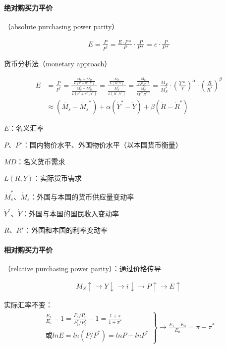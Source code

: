 \documentclass[12pt]{book}
\begin{document}
\paragraph{绝对购买力平价}

（absolute purchasing power parity）

\begin{gather*}
    E=\frac{P}{P^\ast}
    =\frac{E·P*}{P}·\frac{P}{P*}=e⋅\frac{P}{P*}  
\end{gather*}


货币分析法（monetary approach）

\begin{align*}
E
&=\frac{P}{P^\ast}
=\frac{\frac{M_S=M_D}{L\left(r+\pi^e,Y\right)}}{\frac{M_S^\ast=M_D^\ast}{L\left(r^\ast+\pi^{e^\ast},Y^\ast\right)}}
=\frac{\frac{M_S}{L\left(R,Y\right)}}{\frac{M_S^\ast}{L\left(R^\ast,Y^\ast\right)}}
=\frac{\frac{M_S}{kY^\alpha R^{-\beta}}}{\frac{M_S^\ast}{kY^{\ast^\alpha}R^{\ast^{-\beta}}}}
=\frac{M_S}{M_S^\ast}·(\frac{Y*}{Y})^\alpha·(\frac{R}{R^*})^\beta\\
&\approx (\dot{M_s}-\dot{M_s}^*)+\alpha(\dot{Y}^*-\dot{Y})+\beta(\dot{R}-\dot{R}^*)
\end{align*}

\par $E$：名义汇率  
\par $P$、$P^∗$：国内物价水平、外国物价水平（以本国货币衡量）  
\par $MD$：名义货币需求  
\par $L(R,Y)$：实际货币需求  
\par ${\dot{M}}_s^\ast$、${\dot{M}}_s$：外国与本国的货币供应量变动率  
\par $\dot{Y}^∗$、$\dot{Y}$：外国与本国的国民收入变动率  
\par $R$、$R^{∗}$：外国和本国的利率变动率


\paragraph{相对购买力平价}

（relative purchasing power parity）：通过价格传导

\begin{gather*}
    M_S\uparrow\rightarrow Y\downarrow\rightarrow i\downarrow\rightarrow P\uparrow\rightarrow E\uparrow 
\end{gather*}

实际汇率不变：
\begin{gather*}
    \left.\begin{matrix}
        \frac{E_1}{E_0}-1 = \frac{P_1/P_0}{P_1^*/P_0^*} -1=\frac{1+\pi}{1+\pi^{*}} \\
    \text{或} lnE=ln(P/P^{*}) = lnP-lnP^{*}
      \end{matrix}\right\}
      →\frac{E_1-E_0}{E_0} = \pi-\pi^{*}
\end{gather*}
\end{document}
